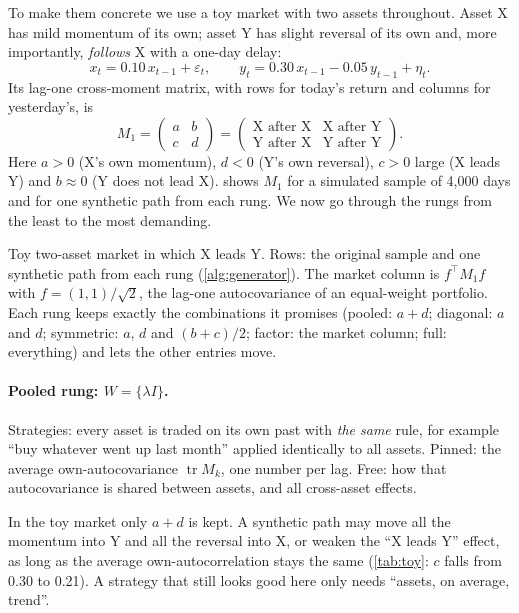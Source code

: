 \documentclass[11pt]{article}
\theoremstyle{definition}
\theoremstyle{remark}
\newcommand{\tr}{\operatorname{tr}}
\begin{document}
To make them concrete we use a toy market with two assets throughout. Asset X has mild momentum of its own; asset Y has
slight reversal of its own and, more importantly, \emph{follows} X with a one-day delay:
\[
  x_t = 0.10\,x_{t-1}+\varepsilon_t,\qquad y_t = 0.30\,x_{t-1}-0.05\,y_{t-1}+\eta_t .
\]
Its lag-one cross-moment matrix, with rows for today's return and columns for yesterday's, is
\[
  M_1=\begin{pmatrix} a & b\\ c & d\end{pmatrix}
  =\begin{pmatrix} \text{X after X} & \text{X after Y}\\ \text{Y after X} & \text{Y after Y}\end{pmatrix}.
\]
Here $a>0$ (X's own momentum), $d<0$ (Y's own reversal), $c>0$ large (X leads Y) and $b\approx 0$ (Y does not lead X).
 shows $M_1$ for a simulated sample of 4{,}000 days and for one synthetic path from each rung. We now go through the rungs from the
least to the most demanding.

\begin{table}[htbp]
\centering\small
\begin{adjustbox}{max width=\textwidth}\end{adjustbox}
\caption{Toy two-asset market in which X leads Y. Rows: the original sample and one synthetic path from each rung (\cref{alg:generator}).
The market column is $f^\top M_1 f$ with $f=(1,1)/\sqrt2$, the lag-one autocovariance of an equal-weight portfolio. Each rung keeps exactly the
combinations it promises (pooled: $a+d$; diagonal: $a$ and $d$; symmetric: $a$, $d$ and $(b+c)/2$; factor: the market column; full: everything)
and lets the other entries move.}
\label{tab:toy}
\end{table}

\paragraph{Pooled rung: $W=\{\lambda I\}$.} Strategies: every asset is traded on its own past with \emph{the same} rule, for example
``buy whatever went up last month'' applied identically to all assets. Pinned: the average own-autocovariance $\tr M_k$, one number per lag.
Free: how that autocovariance is shared between assets, and all cross-asset effects.
\begin{plainwords}[: pooled]
In the toy market only $a+d$ is kept. A synthetic path may move all the momentum into Y and all the reversal into X, or weaken the
``X leads Y'' effect, as long as the average own-autocorrelation stays the same (\cref{tab:toy}: $c$ falls from 0.30 to 0.21).
A strategy that still looks good here only needs ``assets, on average, trend''.
\end{plainwords}
\end{document}
